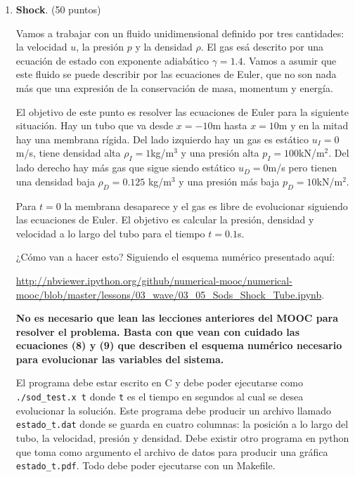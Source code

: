 \documentclass{article}
\begin{document}
\begin{enumerate}
\item {\bf Shock}. (50 puntos)

Vamos a trabajar con un fluido unidimensional definido por tres
cantidades: la velocidad $u$, la presi\'on $p$ y la densidad
$\rho$. El gas es\'a descrito por una ecuaci\'on de estado con
exponente adiab\'atico $\gamma=1.4$. Vamos a asumir que este fluido se
puede describir por las ecuaciones de Euler, que no son nada m\'as que
una expresi\'on de la conservaci\'on de masa, momentum y energ\'ia.  

El objetivo de este punto es resolver las ecuaciones de Euler para la
siguiente situaci\'on. Hay un tubo que va desde $x=-10$m hasta $x=10$m
y en la mitad hay una membrana r\'igida. Del lado izquierdo hay un gas es
est\'atico $u_I=0$m/s, tiene densidad alta $\rho_I=1$kg/m$^3$ y una presi\'on
alta $p_I=100$kN/m$^2$. Del lado derecho hay m\'as gas que sigue
siendo est\'atico $u_D=0$m/s pero tienen una densidad baja
$\rho_D=0.125$ kg/m$^3$ y una presi\'on m\'as baja $p_D=10$kN/m$^2$. 

Para $t=0$ la membrana desaparece y el gas es libre de evolucionar
siguiendo las ecuaciones de Euler. El objetivo es calcular la
presi\'on, densidad y velocidad a lo largo del tubo para el tiempo
$t=0.1$s.

¿Cómo van a hacer esto? Siguiendo el esquema num\'erico presentado
aqu\'i:

\url{http://nbviewer.ipython.org/github/numerical-mooc/numerical-mooc/blob/master/lessons/03_wave/03_05_Sods_Shock_Tube.ipynb}.

{\bf No es necesario que lean las lecciones anteriores del MOOC para
  resolver el problema. Basta con que vean con cuidado las ecuaciones
  (8) y (9) que describen el esquema num\'erico necesario para
  evolucionar las variables del sistema.}

El programa debe estar escrito en C y debe poder ejecutarse como
\verb"./sod_test.x t" donde \verb"t" es el tiempo en segundos al cual
se desea evolucionar la soluci\'on. Este programa debe producir un
archivo llamado \verb"estado_t.dat" donde se guarda en cuatro
columnas: la posici\'on a lo largo del tubo, la velocidad, presi\'on y
densidad. Debe existir otro programa en python que toma como argumento
el archivo de datos para producir una gr\'afica
\verb"estado_t.pdf". Todo debe poder ejecutarse con un Makefile.

\end{enumerate}
\end{document}
